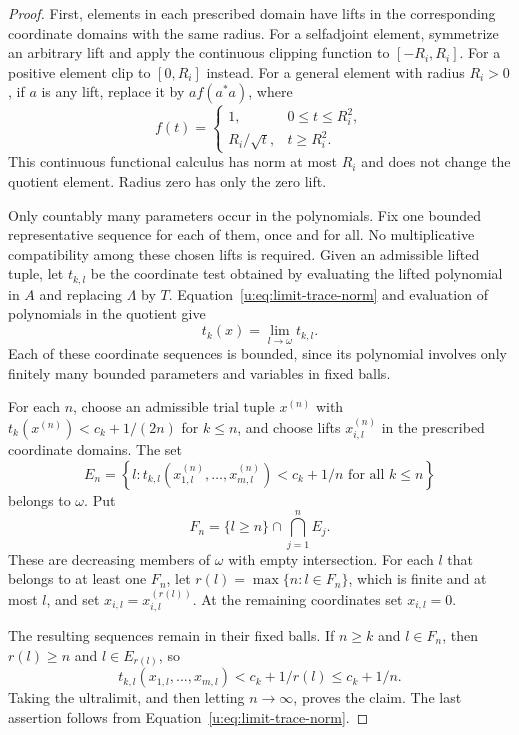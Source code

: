 \begin{proof}
First, elements in each prescribed domain have lifts in the
corresponding coordinate domains with the same radius. For a
selfadjoint element, symmetrize an arbitrary lift and apply the
continuous clipping function to $[-R_i,R_i]$. For a positive element
clip to $[0,R_i]$ instead. For a general element with radius
$R_i>0$, if $a$ is any lift, replace it by $a f(a^*a)$, where
\[
 f(t)=\begin{cases}
 1,&0\le t\le R_i^2,\\
 R_i/\sqrt t,&t\ge R_i^2.
 \end{cases}
\]
This continuous functional calculus has norm at most $R_i$ and
does not change the quotient element. Radius zero has only the
zero lift.

Only countably many parameters occur in the polynomials. Fix one
bounded representative sequence for each of them, once and for
all. No multiplicative compatibility among these chosen lifts is
required. Given an admissible lifted tuple, let $t_{k,l}$ be the
coordinate test obtained by evaluating the lifted polynomial in
$A$ and replacing $\Lambda$ by $T$. Equation~\eqref{u:eq:limit-trace-norm}
and evaluation of polynomials in the quotient give
\[
 t_k(x)=\lim_{l\to\omega}t_{k,l}.
\]
Each of these coordinate sequences is bounded, since its
polynomial involves only finitely many bounded parameters and
variables in fixed balls.

For each $n$, choose an admissible trial tuple $x^{(n)}$ with
$t_k(x^{(n)})<c_k+1/(2n)$ for $k\le n$, and choose lifts
$x^{(n)}_{i,l}$ in the prescribed coordinate domains. The set
\[
 E_n=\left\{l:t_{k,l}(x^{(n)}_{1,l},\ldots,x^{(n)}_{m,l})
                     <c_k+1/n\text{ for all }k\le n\right\}
\]
belongs to $\omega$. Put
\[
 F_n=\{l\ge n\}\cap\bigcap_{j=1}^n E_j.
\]
These are decreasing members of $\omega$ with empty intersection.
For each $l$ that belongs to at least one $F_n$, let
$r(l)=\max\{n:l\in F_n\}$, which is finite and at most $l$,
and set $x_{i,l}=x^{(r(l))}_{i,l}$. At the remaining coordinates
set $x_{i,l}=0$.

The resulting sequences remain in their fixed balls. If $n\ge k$
and $l\in F_n$, then $r(l)\ge n$ and $l\in E_{r(l)}$, so
\[
 t_{k,l}(x_{1,l},\ldots,x_{m,l})
    <c_k+1/r(l)\le c_k+1/n.
\]
Taking the ultralimit, and then letting $n\to\infty$, proves the
claim. The last assertion follows from
Equation~\eqref{u:eq:limit-trace-norm}.
\end{proof}

